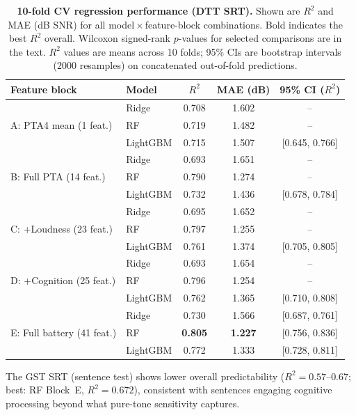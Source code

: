 \documentclass[12pt,a4paper]{article}
\begin{document}
\begin{table}[htbp]
\caption{\textbf{10-fold CV regression performance (DTT SRT).}
Shown are $R^2$ and MAE (dB SNR) for all model\,$\times$\,feature-block
combinations.  Bold indicates the best $R^2$ overall.  Wilcoxon signed-rank
$p$-values for selected comparisons are in the text.  $R^2$ values are means
across 10 folds; 95\% CIs are bootstrap intervals (2000 resamples) on
concatenated out-of-fold predictions.}
\label{tab:benchmark}
\centering
\small
\begin{tabular}{llccc}
\toprule
Feature block & Model & $R^2$ & MAE (dB) & 95\% CI ($R^2$) \\
\midrule
\multirow{3}{*}{A: PTA4 mean (1 feat.)}
  & Ridge     & 0.708 & 1.602 & -- \\
  & RF        & 0.719 & 1.482 & -- \\
  & LightGBM  & 0.715 & 1.507 & [0.645, 0.766] \\
\midrule
\multirow{3}{*}{B: Full PTA (14 feat.)}
  & Ridge     & 0.693 & 1.651 & -- \\
  & RF        & 0.790 & 1.274 & -- \\
  & LightGBM  & 0.732 & 1.436 & [0.678, 0.784] \\
\midrule
\multirow{3}{*}{C: +Loudness (23 feat.)}
  & Ridge     & 0.695 & 1.652 & -- \\
  & RF        & 0.797 & 1.255 & -- \\
  & LightGBM  & 0.761 & 1.374 & [0.705, 0.805] \\
\midrule
\multirow{3}{*}{D: +Cognition (25 feat.)}
  & Ridge     & 0.693 & 1.654 & -- \\
  & RF        & 0.796 & 1.254 & -- \\
  & LightGBM  & 0.762 & 1.365 & [0.710, 0.808] \\
\midrule
\multirow{3}{*}{E: Full battery (41 feat.)}
  & Ridge     & 0.730 & 1.566 & [0.687, 0.761] \\
  & RF        & \textbf{0.805} & \textbf{1.227} & [0.756, 0.836] \\
  & LightGBM  & 0.772 & 1.333 & [0.728, 0.811] \\
\bottomrule
\end{tabular}
\end{table}

The GST SRT (sentence test) shows lower overall predictability ($R^2=0.57$--$0.67$;
best: RF Block~E, $R^2=0.672$), consistent with sentences engaging cognitive
processing beyond what pure-tone sensitivity captures\cite{Ng2015CognitionSIN}.
\end{document}
